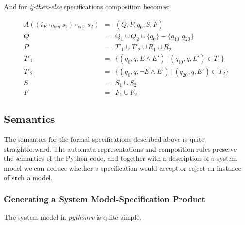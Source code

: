 And for \textit{if-then-else} specifications composition becomes:

\medskip
\[
  \begin{array}{rcl}
  A((i_E \circ_{then} s_1) \circ_{else} s_2) & = & (Q, P, q_0, S, F) \\
                                           Q & = & Q_1 \cup Q_2 \cup \{q_0\} - \{q_{10}, q_{20}\} \\
                                           P & = & T'_1 \cup T'_2 \cup R_1 \cup R_2 \\
                                        T'_1 & = & \{(q_0, q, E       \wedge E') \, | \, (q_{10}, q, E') \in T_1\} \\
                                        T'_2 & = & \{(q_0, q, \neg E \wedge E') \, | \, (q_{20}, q, E') \in T_2\} \\
                                           S & = & S_1 \cup S_2 \\
                                           F & = & F_1 \cup F_2
  \end{array}
\]
\medskip





\subsection{Semantics} \label{section-approach-formal-foundation-semantics}

The semantics for the formal specifications described above is quite
straightforward. The automata representations and composition rules preserve
the semantics of the Python code, and together with a description of a system
model we can deduce whether a specification would accept or reject an instance
of such a model.

\subsubsection{Generating a System Model-Specification Product}

The system model in \textit{pythonrv} is quite simple.

